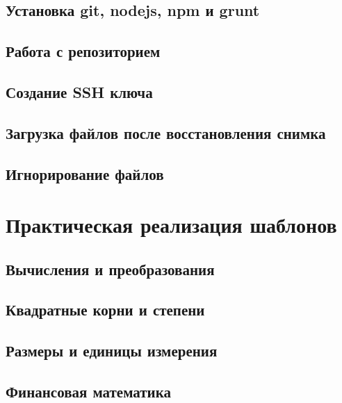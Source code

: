 \documentclass[oneside,final,14pt]{extarticle} %
\begin{document}
\subsection{Установка git, nodejs, npm и grunt}

\newpage

\subsection{Работа с репозиторием}

\newpage

\subsection{Создание SSH ключа}

\newpage

\subsection{Загрузка файлов после восстановления снимка}

\newpage

\subsection{Игнорирование файлов}

\newpage

\section{Практическая реализация шаблонов}
\subsection{Вычисления и преобразования}

\newpage

\subsection{Квадратные корни и степени}

\newpage

\subsection{Размеры и единицы измерения}

\newpage

\subsection{Финансовая математика}

\newpage
\end{document}
